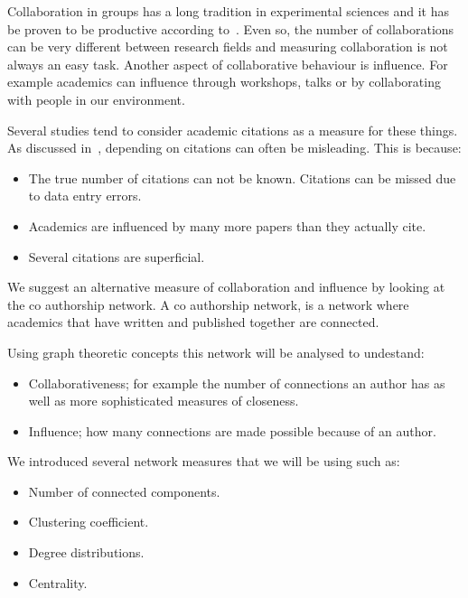 \documentclass{article}
\theoremstyle{definition}
\begin{document}
Collaboration in groups has a long tradition in experimental sciences and it has
be proven to be productive according to~\cite{Etzkowitz1992}. Even so, the number of collaborations
can be very different between research fields and measuring collaboration is
not always an easy task. Another aspect of collaborative behaviour is influence. For
example academics can influence through workshops, talks or by collaborating with people
in our environment.

Several studies tend to consider academic citations as a measure for these things.
As discussed in~\cite{nature_blog}, depending on citations can often be misleading.
This is because:

\begin{itemize}
    \item The true number of citations can not be known. Citations can be missed
    due to data entry errors.
    \item Academics are influenced by many more papers than they actually cite.
    \item Several citations are superficial.
\end{itemize}

We suggest an alternative measure of collaboration and influence by looking at the co
authorship network. A co authorship network,
is a network where academics that have written and published together are connected.

Using graph theoretic concepts this network will be analysed to undestand:

\begin{itemize}
    \item Collaborativeness; for example the number of connections an author has
    as well as more sophisticated measures of closeness.
    \item Influence; how many connections are made possible because of an author.
\end{itemize}

We introduced several network measures that we will be using such as:

\begin{itemize}
    \item Number of connected components.
    \item Clustering coefficient.
    \item Degree distributions.
    \item Centrality.
\end{itemize}
\end{document}

